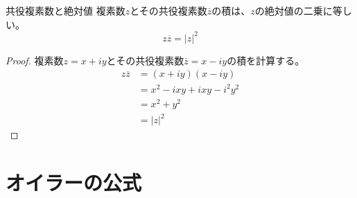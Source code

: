\documentclass[../math-imaging]{subfiles}
\begin{document}
\begin{theorem}{共役複素数と絶対値}
  \newline
  複素数$z$とその共役複素数$\overline{z}$の積は、$z$の絶対値の二乗に等しい。
  \LARGE
  \begin{equation}
    z\overline{z} = |z|^2
  \end{equation}
\end{theorem}

\begin{proof}
  複素数$z=x+iy$とその共役複素数$\overline{z}=x-iy$の積を計算する。
  \begin{align*}
    z\overline{z} & = (x+iy)(x-iy)             \\
                  & = x^2 - ixy + ixy - i^2y^2 \\
                  & = x^2 + y^2                \\
                  & = |z|^2
  \end{align*}
\end{proof}

\section{オイラーの公式}
\end{document}
